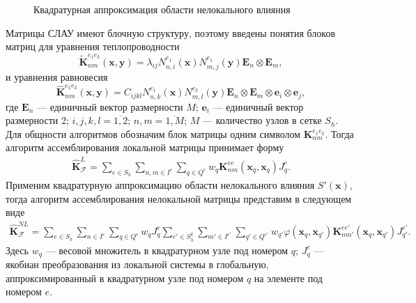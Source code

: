 \begin{figure}[ht]
    \caption{Квадратурная аппроксимация области нелокального влияния}\label{fig:ApproxSQ}
\end{figure}

Матрицы СЛАУ имеют блочную структуру, поэтому введены понятия блоков матриц для уравнения теплопроводности
\[
	\widetilde{\textbf{K}}_{nm}^{e_1 e_2} (\boldsymbol{x}, \boldsymbol{y}) =
	\lambda_{ij} N_{n,i}^{e_1} (\boldsymbol{x}) N_{m,j}^{e_1} (\boldsymbol{y})
	\boldsymbol{E}_n \otimes \boldsymbol{E}_m,
\]
и уравнения равновесия
\[
	\widehat{\textbf{K}}_{nm}^{e_1 e_2} (\boldsymbol{x}, \boldsymbol{y}) = 
	C_{ijkl} N_{n,k}^{e_1} (\boldsymbol{x}) N_{m,l}^{e_2} (\boldsymbol{y}) \boldsymbol{E}_n \otimes \boldsymbol{E}_m \otimes \boldsymbol{e}_i \otimes \boldsymbol{e}_j,
\]
где $\boldsymbol{E}_n$ --- единичный вектор размерности $M$; $\boldsymbol{e}_i$ --- единичный вектор размерности 2; $i,j,k,l = \overline{1,2}$; $n,m = \overline{1,M}$; $M$ --- количество узлов в сетке $S_h$. Для общности алгоритмов обозначим блок матрицы одним символом $\textbf{K}_{nm}^{e_1 e_2}$. Тогда алгоритм ассемблирования локальной матрицы принимает форму
\begin{gather}
	\label{eq:localMatrix}
	\widehat{\textbf{K}}^L_{\mathcal{F}} =
	\sum\limits_{e \in S_h}
	\sum\limits_{n,m \in I^e}
	\sum\limits_{q \in Q^e}
	w_q \textbf{K}^{ee}_{nm} (\boldsymbol{x}_q, \boldsymbol{x}_q) J_q^e.
\end{gather}
Применим квадратурную аппроксимацию области нелокального влияния $S'(\boldsymbol{x})$, тогда алгоритм ассемблирования нелокальной матрицы представим в следующем виде
\begin{gather}
	\label{eq:NonlocalMatrix}
	\widehat{\textbf{K}}^{NL}_{\mathcal{F}} =
	\sum\limits_{e \in S_h}
	\sum\limits_{n \in I^e}
	\sum\limits_{q \in Q^e}
	w_q J_q^e
	\sum\limits_{e' \in S_h^q}
	\sum\limits_{m' \in I^{e'}}
	\sum\limits_{q' \in Q^{e'}}
	w_{q'} \varphi(\boldsymbol{x}_q, \boldsymbol{x}_{q'}) 
	\textbf{K}_{nm'}^{e e'}(\boldsymbol{x}_q, \boldsymbol{x}_{q'}) J_{q'}^{e'}.
\end{gather}
Здесь $w_q$ --- весовой множитель в квадратурном узле под номером $q$; $J_q^e$ --- якобиан преобразования из локальной системы в глобальную, аппроксимированный в квадратурном узле под номером $q$ на элементе под номером $e$.


